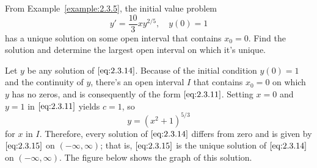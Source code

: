\documentclass{ximera}
\begin{document}
\begin{example}
\begin{explanation}
\end{explanation}
\end{example}

\begin{example}\label{example:2.3.8}
From Example~\ref{example:2.3.5}, the initial value
problem
\begin{equation} \label{eq:2.3.14}
y'=\frac{10}{3}xy^{2/5}, \quad y(0)=1
\end{equation}
 has a unique solution on some open interval that contains $x_0=0$.
Find the solution and determine the largest open interval on which it's
unique.
\begin{explanation}
Let $y$ be any solution of $\eqref{eq:2.3.14}$. Because of the initial
condition $y(0)=1$ and the continuity of $y$, there's an open interval
$I$ that contains $x_0=0$ on which $y$ has no zeros, and is consequently
of the form $\eqref{eq:2.3.11}$. Setting $x=0$ and $y=1$ in $\eqref{eq:2.3.11}$
yields $c=1$, so
\begin{equation} \label{eq:2.3.15}
y=(x^2+1)^{5/3}
\end{equation}
for $x$ in $I$. Therefore, every solution of $\eqref{eq:2.3.14}$
differs from zero and is given by $\eqref{eq:2.3.15}$ on $(-\infty,\infty)$;
that is, $\eqref{eq:2.3.15}$ is the unique solution of $\eqref{eq:2.3.14}$ on
$(-\infty,\infty)$.
The figure below shows the graph of this solution.

\begin{center}
\end{center}

\end{explanation}
\end{example}
\end{document}
